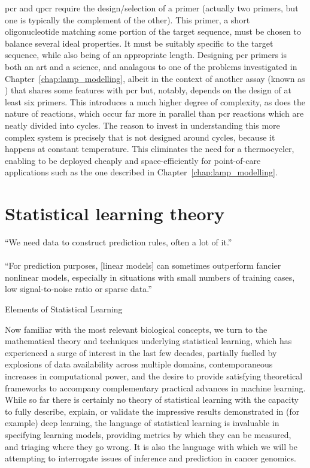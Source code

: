 \documentclass[thesis.tex]{subfiles}
\begin{document}
\Gls{pcr} and \gls{qpcr} require the design/selection of a primer (actually two primers, but one is typically the complement of the other). This primer, a short oligonucleotide matching some portion of the target sequence, must be chosen to balance several ideal properties. It must be suitably specific to the target  sequence, while also being of an appropriate length. Designing \gls{pcr} primers is both an art and a science, and analagous to one of the problems investigated in Chapter~\ref{chap:lamp_modelling}, albeit in the context of another assay (known as ) that shares some features with \gls{pcr} but, notably, depends on the design of at least six primers. This introduces a much higher degree of complexity, as does the nature of  reactions, which occur far more in parallel than \gls{pcr} reactions which are neatly divided into cycles. The reason to invest in understanding this more complex system is precisely that  is not designed around cycles, because it happens at constant temperature. This eliminates the need for a thermocycler, enabling  to be deployed cheaply and space-efficiently for point-of-care applications such as the one described in Chapter~\ref{chap:lamp_modelling}.

\section{Statistical learning theory} \label{sec:statistical_learning}
\epigraph{``We need data to construct prediction rules, often a lot of it.'' \\
~\\
``For prediction purposes, [linear models] can sometimes outperform fancier
nonlinear models, especially in situations with small numbers of training
cases, low signal-to-noise ratio or sparse data.''}{Elements of Statistical Learning \\
\citep{hastie_elements_2009}}

Now familiar with the most relevant biological concepts, we turn to the mathematical theory and techniques underlying statistical learning, which has experienced a surge of interest in the last few decades, partially fuelled by explosions of data availability across multiple domains, contemporaneous increases in computational power, and the desire to provide satisfying theoretical frameworks to accompany complementary practical advances in machine learning. While so far there is certainly no theory of statistical learning with the capacity to fully describe, explain, or validate the impressive results demonstrated in (for example) deep learning, the language of statistical learning is invaluable in specifying learning models, providing metrics by which they can be measured, and triaging where they go wrong. It is also the language with which we will be attempting to interrogate issues of inference and prediction in cancer genomics. 
\end{document}
